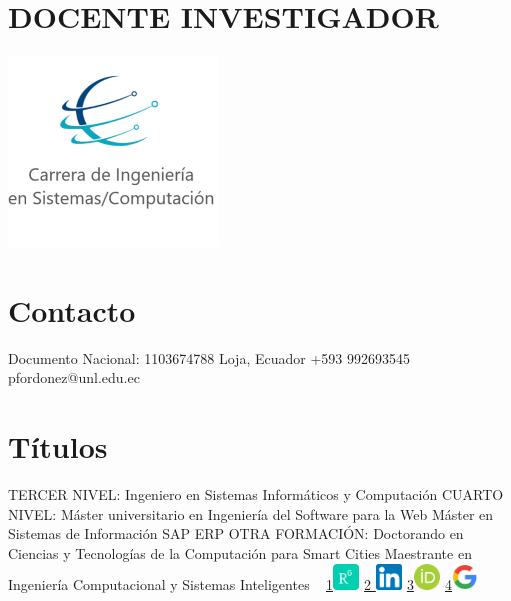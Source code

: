 \documentclass[]{cv-style} %
\begin{document}
\hfill

\begin{aside}

\section{DOCENTE INVESTIGADOR} 

\hfill

\includegraphics[scale=0.5]{logoCOMP.png}
\section{Contacto}
Documento Nacional: 1103674788
Loja, Ecuador
+593 992693545
pfordonez@unl.edu.ec

\section{Títulos}
TERCER NIVEL:
Ingeniero en Sistemas Informáticos y Computación
CUARTO NIVEL:
Máster universitario en Ingeniería del Software para la Web
Máster en Sistemas de Información SAP ERP
OTRA FORMACIÓN:
Doctorando en Ciencias y Tecnologías de la Computación para Smart Cities
Maestrante en Ingeniería Computacional y Sistemas Inteligentes 
~
\href{https://www.researchgate.net/profile/Pablo_Ordonez-Ordonez}{1\includegraphics[width=0.7cm]{rgate.png}}
\hfill
\href{https://www.linkedin.com/in/pfordonez/}{2 \includegraphics[width=0.7cm]{linkedin.png}}
\hfill
\href{https://orcid.org/0000-0001-8079-7694}{3\includegraphics[width=0.7cm]{orcid.png}}
\hfill
\href{https://scholar.google.com/citations?hl=es&authuser=1&user=3q7qBpwAAAAJ}{4\includegraphics[width=0.7cm]{google.png}}

\end{aside}
\end{document}
